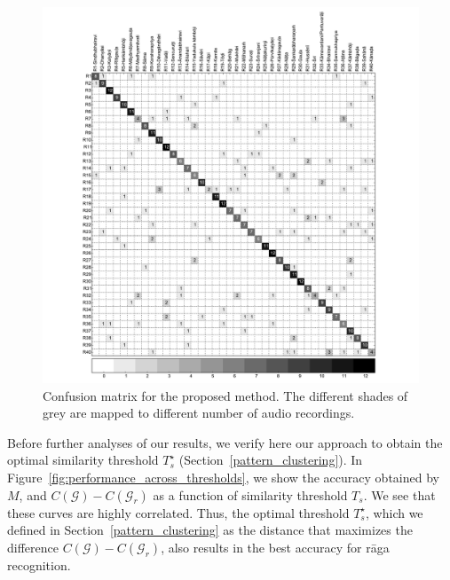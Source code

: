 \begin{figure}
	\begin{center}
		\includegraphics[width=\figSizeHundred]{ch07_ragaRecognition/figures/cnf_mtx_40raga_with_annotation.pdf}
	\end{center}
	\caption{Confusion matrix for the proposed method. The different shades of grey are mapped to different number of audio recordings.}
	\label{fig:confusion_matrix}
\end{figure}

Before further analyses of our results, we verify here our approach to obtain the optimal similarity threshold $T_{s}^\star$ (Section~\ref{pattern_clustering}). In Figure~\ref{fig:performance_across_thresholds}, we show the accuracy obtained by $M$, and  $C(\mathcal{G})-C(\mathcal{G}_r)$ as a function of similarity threshold $T_{s}$. We see that these curves are highly correlated. Thus, the optimal threshold $T_{s}^\star$, which we defined in Section~\ref{pattern_clustering} as the distance that maximizes the difference $C(\mathcal{G})-C(\mathcal{G}_r)$, also results in the best accuracy for r\={a}ga recognition.

